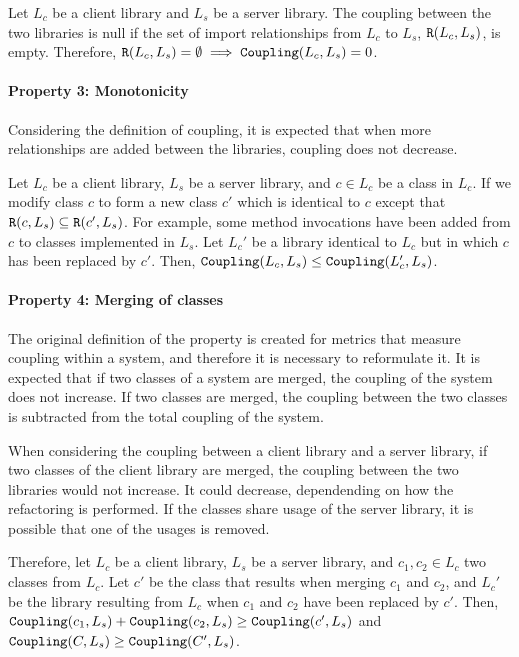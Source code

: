 Let $L_c$ be a client library and $L_s$ be a server library. The coupling between the two libraries is null if the set of import relationships from $L_c$ to $L_s$, $\verb|R|(L_c, L_s)$, is empty. Therefore, $\verb|R|(L_c, L_s) = \emptyset \implies \verb|Coupling|(L_c, L_s) = 0$.

\paragraph{Property 3: Monotonicity}
Considering the definition of coupling, it is expected that when more relationships are added between the libraries, coupling does not decrease.

Let $L_c$ be a client library, $L_s$ be a server library, and $c \in L_c$ be a class in $L_c$. If we modify class $c$ to form a new class $c'$ which is identical to $c$ except that $\verb|R|(c, L_s) \subseteq \verb|R|(c', L_s)$. For example, some method invocations have been added from $c$ to classes implemented in $L_s$. Let $L_c'$ be a library identical to $L_c$ but in which $c$ has been replaced by $c'$. Then, $\verb|Coupling|(L_c, L_s) \le \verb|Coupling|(L_c', L_s)$.

\paragraph{Property 4: Merging of classes}
The original definition of the property is created for metrics that measure coupling within a system, and therefore it is necessary to reformulate it. It is expected that if two classes of a system are merged, the coupling of the system does not increase. If two classes are merged, the coupling between the two classes is subtracted from the total coupling of the system.

When considering the coupling between a client library and a server library, if two classes of the client library are merged, the coupling between the two libraries would not increase. It could decrease, dependending on how the refactoring is performed. If the classes share usage of the server library, it is possible that one of the usages is removed.

Therefore, let $L_c$ be a client library, $L_s$ be a server library, and $c_1, c_2 \in L_c$ two classes from $L_c$. Let $c'$ be the class that results when merging  $c_1$ and $c_2$, and $L_c'$ be the library resulting from $L_c$ when $c_1$ and $c_2$ have been replaced by $c'$. Then, $\verb|Coupling|(c_1, L_s) + \verb|Coupling|(c_2, L_s) \ge \verb|Coupling|(c', L_s)$ and $\verb|Coupling|(C, L_s) \ge \verb|Coupling|(C', L_s)$.

